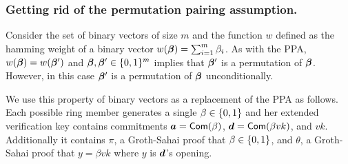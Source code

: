 


\subsubsection{Getting rid of the permutation pairing assumption.}

Consider the set of binary vectors of size $m$ and the function $w$ defined as the hamming weight of a binary vector $w({\boldsymbol{\beta}}) = \sum_{i=1}^m \beta_i$.  As with the PPA, $w({\boldsymbol{\beta}})=w({\boldsymbol{\beta}}')$ and ${\boldsymbol{\beta}},{\boldsymbol{\beta}}'\in\{0,1\}^m$ implies that ${\boldsymbol{\beta}}'$ is a permutation of ${\boldsymbol{\beta}}$. However, in this case ${\boldsymbol{\beta}}'$ is a permutation of ${\boldsymbol{\beta}}$ unconditionally.

We use this property of binary vectors as a replacement of the PPA as follows.
Each possible ring member generates a single $\beta\in\{0,1\}$ and her extended verification key contains commitments ${\boldsymbol{a}}=\mathsf{Com}(\beta)$, ${\boldsymbol{d}} = \mathsf{Com}(\beta vk)$, and $vk$. Additionally it contains $\pi$, a Groth-Sahai proof that $\beta\in\{0,1\}$, and $\theta$, a Groth-Sahai proof that $y = \beta vk$ where $y$ is ${\boldsymbol{d}}$'s opening.

